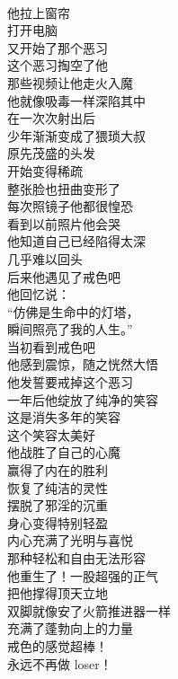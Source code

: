 \begin{poem}[内在的胜利]
    \begin{multicols}{3}
        \begin{center}~\\
            他拉上窗帘 \\ 打开电脑 \\ 又开始了那个恶习 \\ 这个恶习掏空了他 \\ 那些视频让他走火入魔 \\ 他就像吸毒一样深陷其中 \\ 在一次次射出后 \\ 少年渐渐变成了猥琐大叔 \\ 原先茂盛的头发 \\ 开始变得稀疏 \\ 整张脸也扭曲变形了 \\ 每次照镜子他都很惶恐 \\ 看到以前照片他会哭 \\ 他知道自己已经陷得太深 \\ 几乎难以回头 \\ 后来他遇见了戒色吧 \\ 他回忆说： \\ “仿佛是生命中的灯塔， \\ 瞬间照亮了我的人生。” \\ 当初看到戒色吧 \\ 他感到震惊，随之恍然大悟 \\ 他发誓要戒掉这个恶习 \\ 一年后他绽放了纯净的笑容 \\ 这是消失多年的笑容 \\ 这个笑容太美好 \\ 他战胜了自己的心魔 \\ 赢得了内在的胜利 \\ 恢复了纯洁的灵性 \\ 摆脱了邪淫的沉重 \\ 身心变得特别轻盈 \\ 内心充满了光明与喜悦 \\ 那种轻松和自由无法形容 \\ 他重生了！一股超强的正气 \\ 把他撑得顶天立地 \\ 双脚就像安了火箭推进器一样 \\ 充满了蓬勃向上的力量 \\ 戒色的感觉超棒！ \\ 永远不再做 loser！
        \end{center}
    \end{multicols}
\end{poem}

